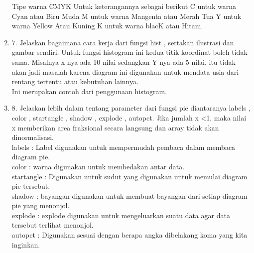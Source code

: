 \documentclass[10pt]{article}
\begin{document}
\begin{enumerate}
Tipe warna CMYK
    Untuk keterangannya sebagai berikut
    C untuk warna Cyan atau Biru Muda
    M untuk warna Mangenta atau Merah Tua
    Y untuk warna Yellow Atau Kuning
    K untuk warna blacK atau Hitam.\\

\item 7. Jelaskan bagaimana cara kerja dari fungsi hist , sertakan ilustrasi dan gambar sendiri.
Untuk fungsi histogram ini kedua titik koordinat boleh tidak sama. Misalnya x nya ada 10 nilai sedangkan Y nya ada 5 nilai, itu tidak akan jadi masalah karena diagram ini digunakan untuk mendata usia dari rentang tertentu atau kebutuhan lainnya.\\

Ini merupakan contoh dari penggunaan histogram.\\

\item 8. Jelaskan lebih dalam tentang parameter dari fungsi pie diantaranya labels , color , startangle , shadow , explode , autopct.
Jika jumlah x <1, maka nilai x memberikan area fraksional secara langsung dan array tidak akan dinormalisasi.\\

labels : Label digunakan untuk mempermudah pembaca dalam membaca diagram pie.\\

color : warna digunakan untuk membedakan antar data.\\

startangle : Digunakan untuk sudut yang digunakan untuk memulai diagram pie tersebut.\\

shadow :  bayangan digunakan untuk membuat bayangan dari setiap diagram pie yang menonjol.\\

explode : explode digunakan untuk mengeluarkan suatu data agar data tersebut terlihat menonjol.\\

autopct : Digunakan sesuai dengan berapa angka dibelakang koma yang kita inginkan.\\

\end{enumerate}
\end{document}
